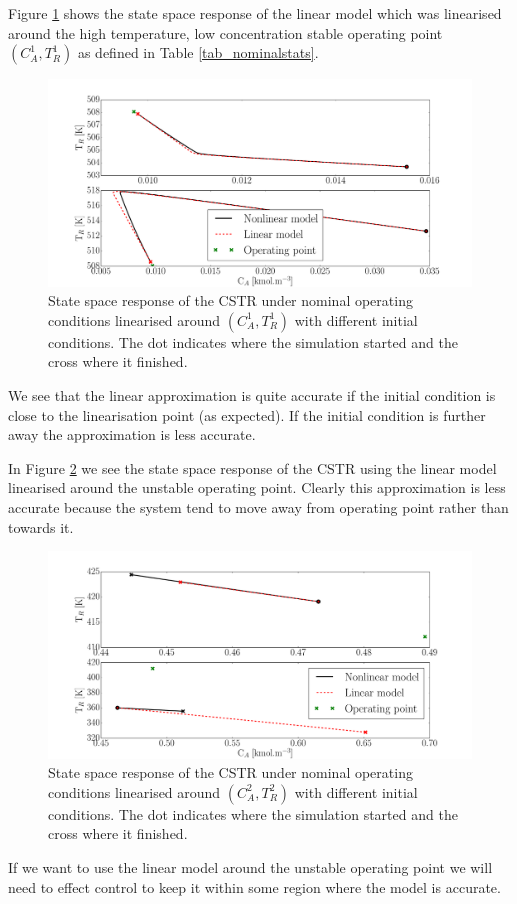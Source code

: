 \documentclass[../masters.tex]{subfiles}
\begin{document}
Figure \ref{fig_cstr_lin_1} shows the state space response of the linear model which was linearised around the high temperature, low concentration stable operating point $(C_A^1,T_R^1)$ as defined in Table \ref{tab_nominalstats}.
\begin{figure}[H] 
\centering
\includegraphics[scale=0.3]{cstr_lin_1.pdf}
\caption{State space response of the CSTR under nominal operating conditions linearised around $(C_A^1,T_R^1)$ with different initial conditions. The dot indicates where the simulation started and the cross where it finished.}
\label{fig_cstr_lin_1}
\end{figure}
We see that the linear approximation is quite accurate if the initial condition is close to the linearisation point (as expected). If the initial condition is further away the approximation is less accurate.

In Figure \ref{fig_cstr_lin_2} we see the state space response of the CSTR using the linear model linearised around the unstable operating point. Clearly this approximation is less accurate because the system tend to move away from operating point rather than towards it. 
\begin{figure}[H] 
\centering
\includegraphics[scale=0.3]{cstr_lin_2.pdf}
\caption{State space response of the CSTR under nominal operating conditions linearised around $(C_A^2,T_R^2)$ with different initial conditions. The dot indicates where the simulation started and the cross where it finished.}
\label{fig_cstr_lin_2}
\end{figure}
If we want to use the linear model around the unstable operating point we will need to effect control to keep it within some region where the model is accurate.
\end{document}
